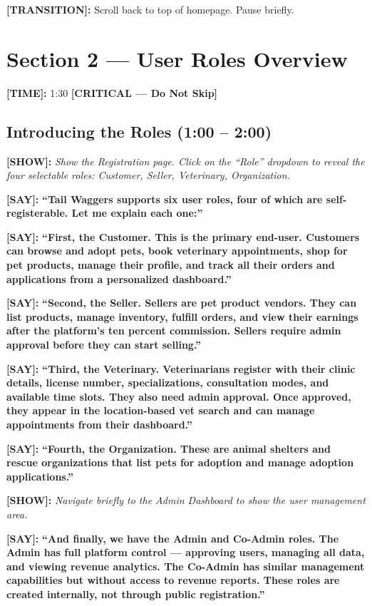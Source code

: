 \documentclass[12pt,a4paper]{article}
\newcommand{\say}[1]{\textbf{\textcolor{narration}{[SAY]:}} \textbf{``#1''}}
\newcommand{\show}[1]{\textbf{\textcolor{screen}{[SHOW]:}} \textit{#1}}
\newcommand{\timing}[1]{\textbf{\textcolor{timing}{[TIME]:}} #1}
\newcommand{\trans}[1]{\textbf{\textcolor{transition}{[TRANSITION]:}} #1}
\newcommand{\critical}{\textcolor{critical}{\textbf{[CRITICAL --- Do Not Skip]}}}
\begin{document}
\trans{Scroll back to top of homepage. Pause briefly.}

\newpage

\section{Section 2 --- User Roles Overview}
\label{sec:roles}

\timing{1:30} \hfill \critical

\subsection{Introducing the Roles (1:00 -- 2:00)}

\show{Show the Registration page. Click on the ``Role'' dropdown to reveal the four selectable roles: Customer, Seller, Veterinary, Organization.}

\say{Tail Waggers supports six user roles, four of which are self-registerable. Let me explain each one:}

\say{First, the \textbf{Customer}. This is the primary end-user. Customers can browse and adopt pets, book veterinary appointments, shop for pet products, manage their profile, and track all their orders and applications from a personalized dashboard.}

\say{Second, the \textbf{Seller}. Sellers are pet product vendors. They can list products, manage inventory, fulfill orders, and view their earnings after the platform's ten percent commission. Sellers require admin approval before they can start selling.}

\say{Third, the \textbf{Veterinary}. Veterinarians register with their clinic details, license number, specializations, consultation modes, and available time slots. They also need admin approval. Once approved, they appear in the location-based vet search and can manage appointments from their dashboard.}

\say{Fourth, the \textbf{Organization}. These are animal shelters and rescue organizations that list pets for adoption and manage adoption applications.}

\show{Navigate briefly to the Admin Dashboard to show the user management area.}

\say{And finally, we have the \textbf{Admin} and \textbf{Co-Admin} roles. The Admin has full platform control --- approving users, managing all data, and viewing revenue analytics. The Co-Admin has similar management capabilities but without access to revenue reports. These roles are created internally, not through public registration.}
\end{document}

